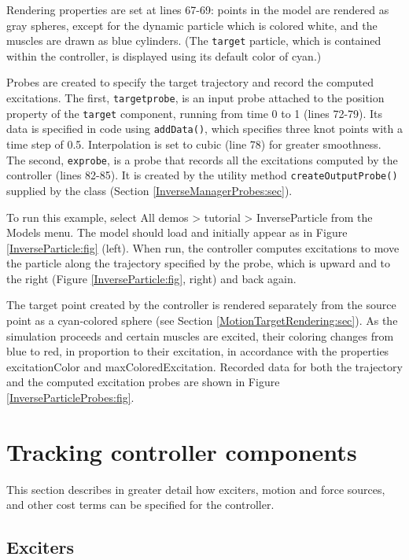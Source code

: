 Rendering properties are set at lines 67-69: points in the model are rendered
as gray spheres, except for the dynamic particle which is colored white, and
the muscles are drawn as blue cylinders. (The {\tt target} particle, which is
contained within the controller, is displayed using its default color of cyan.)

Probes are created to specify the target trajectory and record the computed
excitations. The first, {\tt targetprobe}, is an input probe attached to the
{\sf position} property of the {\tt target} component, running from time 0 to 1
(lines 72-79). Its data is specified in code using {\tt addData()}, which
specifies three knot points with a time step of 0.5. Interpolation is set to
cubic (line 78) for greater smoothness. The second, {\tt exprobe}, is a probe
that records all the excitations computed by the controller (lines 82-85).  It
is created by the utility method {\tt createOutputProbe()} supplied by
the  class
(Section \ref{InverseManagerProbes:sec}).

To run this example, select {\sf All demos > tutorial > InverseParticle} from
the {\sf Models} menu. The model should load and initially appear as in
Figure \ref{InverseParticle:fig} (left). When run, the controller computes
excitations to move the particle along the trajectory specified by the probe,
which is upward and to the right (Figure \ref{InverseParticle:fig}, right) and
back again. 

The target point created by the controller is rendered separately from the
source point as a cyan-colored sphere (see
Section \ref{MotionTargetRendering:sec}). As the simulation proceeds and
certain muscles are excited, their coloring changes from blue to red, in
proportion to their excitation, in accordance with the properties {\sf
excitationColor} and {\sf maxColoredExcitation}. Recorded data for both the
trajectory and the computed excitation probes are shown in
Figure \ref{InverseParticleProbes:fig}.

\section{Tracking controller components}

This section describes in greater detail how exciters, motion and force
sources, and other cost terms can be specified for the controller.

\subsection{Exciters}
\label{Exciters:sec}

